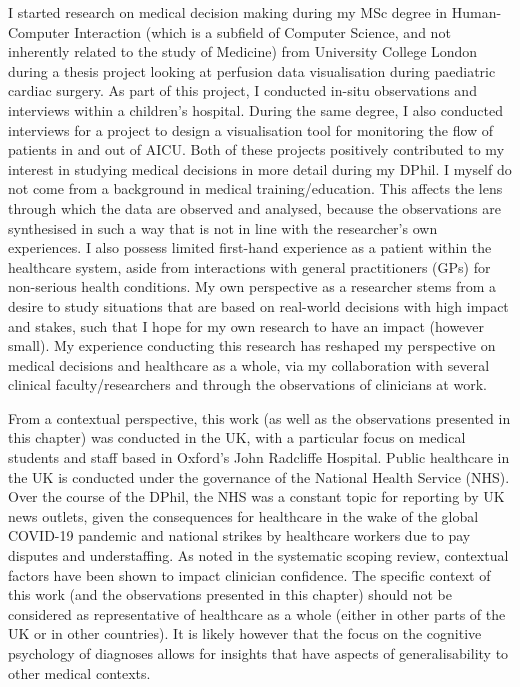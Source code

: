 \documentclass[a4paper, nobind]{templates/ociamthesis}
\begin{document}
I started research on medical decision making during my MSc degree in Human-Computer Interaction (which is a subfield of Computer Science, and not inherently related to the study of Medicine) from University College London during a thesis project looking at perfusion data visualisation during paediatric cardiac surgery. As part of this project, I conducted in-situ observations and interviews within a children's hospital. During the same degree, I also conducted interviews for a project to design a visualisation tool for monitoring the flow of patients in and out of AICU. Both of these projects positively contributed to my interest in studying medical decisions in more detail during my DPhil. I myself do not come from a background in medical training/education. This affects the lens through which the data are observed and analysed, because the observations are synthesised in such a way that is not in line with the researcher's own experiences. I also possess limited first-hand experience as a patient within the healthcare system, aside from interactions with general practitioners (GPs) for non-serious health conditions. My own perspective as a researcher stems from a desire to study situations that are based on real-world decisions with high impact and stakes, such that I hope for my own research to have an impact (however small). My experience conducting this research has reshaped my perspective on medical decisions and healthcare as a whole, via my collaboration with several clinical faculty/researchers and through the observations of clinicians at work.

\hfill\break
From a contextual perspective, this work (as well as the observations presented in this chapter) was conducted in the UK, with a particular focus on medical students and staff based in Oxford's John Radcliffe Hospital. Public healthcare in the UK is conducted under the governance of the National Health Service (NHS). Over the course of the DPhil, the NHS was a constant topic for reporting by UK news outlets, given the consequences for healthcare in the wake of the global COVID-19 pandemic and national strikes by healthcare workers due to pay disputes and understaffing. As noted in the systematic scoping review, contextual factors have been shown to impact clinician confidence. The specific context of this work (and the observations presented in this chapter) should not be considered as representative of healthcare as a whole (either in other parts of the UK or in other countries). It is likely however that the focus on the cognitive psychology of diagnoses allows for insights that have aspects of generalisability to other medical contexts.
\end{document}
